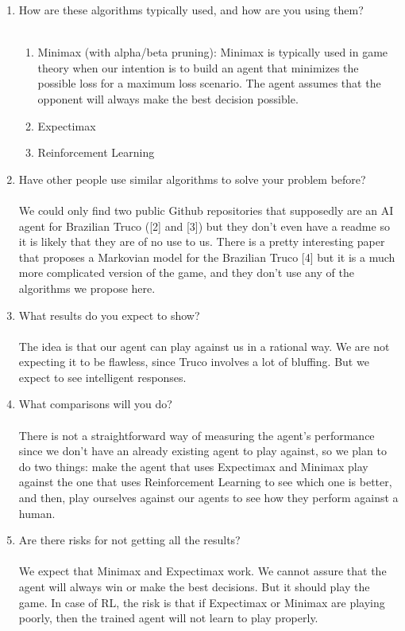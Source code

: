 \documentclass{article}
\begin{document}
\begin{enumerate}
\item How are these algorithms typically used, and how are you using them?
\\\\
\begin{enumerate}
	\item Minimax (with alpha/beta pruning): Minimax is typically used in game theory when our intention is to build an agent that minimizes the possible loss for a maximum loss scenario. The agent assumes that the opponent will always make the best decision possible.
	\item Expectimax
	\item Reinforcement Learning
\end{enumerate}

\item Have other people use similar algorithms to solve your problem before?
\\\\
We could only find two public Github repositories that supposedly are an AI agent for Brazilian Truco ([2] and [3]) but they don’t even have a readme so it is likely that they are of no use to us. There is a pretty interesting paper that proposes a Markovian model for the Brazilian Truco [4] but it is a much more complicated version of the game, and they don’t use any of the algorithms we propose here.

\item What results do you expect to show?
\\\\
The idea is that our agent can play against us in a rational way. We are not expecting it to be flawless, since Truco involves a lot of bluffing. But we expect to see intelligent responses.                                                                                                                        

\item What comparisons will you do?
\\\\
There is not a straightforward way of measuring the agent’s performance since we don’t have an already existing agent to play against, so we plan to do two things: make the agent that uses Expectimax and Minimax play against the one that uses Reinforcement Learning to see which one is better, and then, play ourselves against our agents to see how they perform against a human.
\item Are there risks for not getting all the results?
\\\\ 
We expect that Minimax and Expectimax work. We cannot assure that the agent will always win or make the best decisions. But it should play the game. In case of RL, the risk is that if Expectimax or Minimax are playing poorly, then the trained agent will not learn to play properly.    
    

\end{enumerate}
\end{document}
